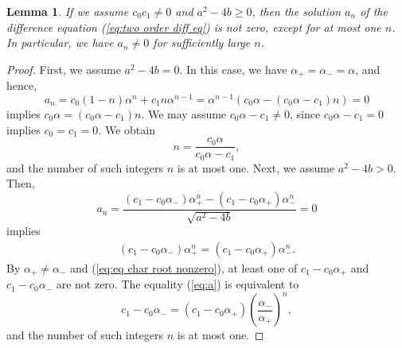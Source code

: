 \documentclass[a4paper,11pt,reqno]{amsart}
\theoremstyle{plain}
\newtheorem{lem}[thm]{Lemma}
\theoremstyle{definition}
\begin{document}
\begin{lem}
\label{thm:Goto lemma}
If we assume $c_{0}c_{1}\not=0$ and $a^{2}-4b\geq 0$, 
then the solution $a_{n}$ of the difference equation (\ref{eq:two order diff eq}) is not zero, 
except for at most one $n$. 
In particular, we have $a_{n}\not=0$ for sufficiently large $n$. 
\end{lem}
\begin{proof}
First, we assume $a^{2}-4b=0$. 
In this case, we have $\alpha _{+}=\alpha _{-}=\alpha $, and hence, 
$$
a_{n}=c_{0}(1-n)\alpha ^{n}+c_{1}n\alpha ^{n-1}=\alpha ^{n-1}(c_{0}\alpha -(c_{0}\alpha -c_{1})n)=0
$$
implies $c_{0}\alpha =(c_{0}\alpha -c_{1})n$. 
We may assume $c_{0}\alpha -c_{1}\not=0$, since $c_{0}\alpha -c_{1}=0$ implies $c_{0}=c_{1}=0$. 
We obtain 
$$
n=\frac{c_{0}\alpha }{c_{0}\alpha -c_{1}} ,
$$
and the number of such integers $n$ is at most one. 
Next, we assume $a^{2}-4b>0$. Then, 
$$
a_{n}=\frac{(c_{1}-c_{0}\alpha _{-})\alpha _{+}^{n}-(c_{1}-c_{0}\alpha _{+})\alpha _{-}^{n}}{\sqrt{a^{2}-4b}}=0
$$
implies 
\begin{align}
\label{eq:a}
(c_{1}-c_{0}\alpha _{-})\alpha _{+}^{n}=(c_{1}-c_{0}\alpha _{+})\alpha _{-}^{n}.
\end{align}
By $\alpha _{+}\not=\alpha _{-}$ and (\ref{eq:eq char root nonzero}),
at least one of $c_{1}-c_{0}\alpha _{+}$ and $c_{1}-c_{0}\alpha _{-}$ are not zero. 
The equality (\ref{eq:a}) is equivalent to 
$$
c_{1}-c_{0}\alpha _{-}=(c_{1}-c_{0}\alpha _{+})\left(\frac{\alpha _{-}}{\alpha _{+}}\right)^{n} ,
$$
and the number of such integers $n$ is at most one. 
\end{proof}
\end{document}

